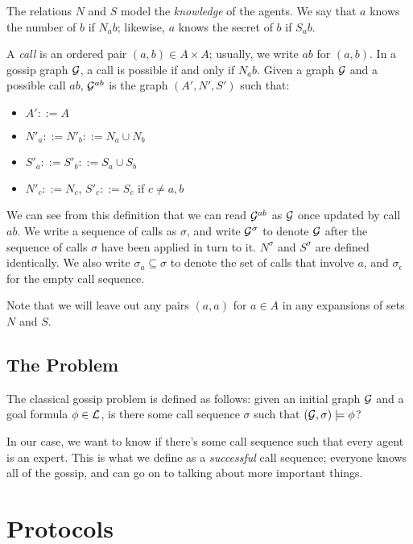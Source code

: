 \documentclass[12pt, a4paper]{article} %
\begin{document}
The relations $N$ and $S$ model the \textit{knowledge} of the agents. We say that $a$ knows the number of $b$ if $N_a b$; likewise, $a$ knows the secret of $b$ if $S_a b$. 

A \textit{call} is an ordered pair $(a, b) \in A \times A$; usually, we write $ab$ for $(a, b)$. In a gossip graph $\mathcal{G}$, a call is possible if and only if $N_a b$. Given a graph $\mathcal{G}$ and a possible call $ab$, $\mathcal{G}^{ab}$ is the graph $(A', N', S')$ such that:

\begin{itemize}
    \item $A' ::= A$
    \item $N'_a ::= N'_b ::= N_a \cup N_b$ 
    \item $S'_a ::= S'_b ::= S_a \cup S_b$ 
    \item $N'_c ::= N_c$, $S'_c ::= S_c$ if $c \not = a, b$
\end{itemize}   

We can see from this definition that we can read $\mathcal{G}^{ab}$ as $\mathcal{G}$ once updated by call $ab$. We write a sequence of calls as $\sigma$, and write $\mathcal{G}^\sigma$ to denote $\mathcal{G}$ after the sequence of calls $\sigma$ have been applied in turn to it. $N^\sigma$ and $S^\sigma$ are defined identically.  We also write $\sigma_a \subseteq \sigma$ to denote the set of calls that involve $a$, and $\sigma_\epsilon$ for the empty call sequence.

Note that we will leave out any pairs $(a, a)$ for $a \in A$ in any expansions of sets $N$ and $S$.

\subsection{The Problem}

The classical gossip problem is defined as follows: given an initial graph $\mathcal{G}$ and a goal formula $\phi \in \mathcal{L}$, is there some call sequence $\sigma$ such that $(\mathcal{G}, \sigma) \models \phi$?

In our case, we want to know if there's some call sequence such that every agent is an expert. This is what we define as a \textit{successful} call sequence; everyone knows all of the gossip, and can go on to talking about more important things. 

\section{Protocols}
\end{document}
